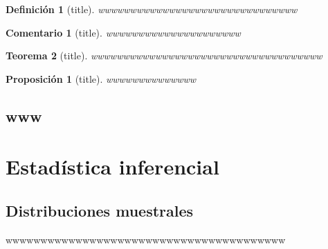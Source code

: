 \documentclass[a4paper]{report}
\newtheorem{rem}{Comentario}[chapter]
\newtheorem{thm}{Teorema}[chapter]
\newtheorem{defn}[thm]{Definición}
\newtheorem{prop}{Proposición}[thm]
\begin{document}
\begin{defn}[title]
wwwwwwwwwwwwwwwwwwwwwwwwwwwwwww
\end{defn}

\begin{rem}[title]
   wwwwwwwwwwwwwwwwwwwww
\end{rem}


\begin{thm}[title]
   wwwwwwwwwwwwwwwwwwwwwwwwwwwwwwwwwwww
\end{thm}

\begin{prop}[title]
   wwwwwwwwwwwwww
\end{prop}
\chapter{www}






























\part{Estadística inferencial}

\chapter{Distribuciones muestrales}


wwwwwwwwwwwwwwwwwwwwwwwwwwwwwwwwwwwwwwww
\end{document}
